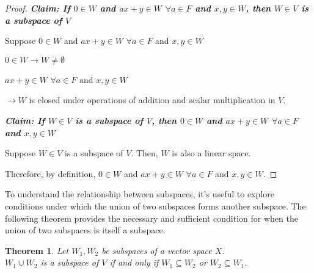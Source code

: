 \documentclass[12pt, reqno]{amsart}
\newtheorem{theorem}{Theorem}[section]
\theoremstyle{definition}
\numberwithin{equation}{section}
\begin{document}
\begin{proof}

\textbf{\textit{Claim: If $ 0 \in W$ and $ax+y \in W$ $\forall a \in F$ and $x,y \in W$, then $W \in V$ is a subspace of $V$}}
    
    Suppose $0 \in W$ and $ax+y \in W$ $\forall a \in F$ and $x,y \in W$
    
    $0 \in W \longrightarrow W \neq \emptyset$ 
    
    $ax+y \in W$ $\forall a \in F$ and $x,y \in W$
    
    $\longrightarrow W$ is closed under operations of addition and scalar multiplication in $V$.
    
    \textbf{\textit{Claim: If $W \in V$ is a subspace of $V$, then $0 \in W$ and $ax+y \in W$ $\forall a \in F$ and $x,y \in W$}}

    Suppose $W \in V$ is a subspace of $V$. Then, $W$ is also a linear space. 
    
    Therefore, by definition, $0 \in W$ and $ax+y \in W$ $\forall a \in F$ and $x,y \in W$.
\end{proof}
To understand the relationship between subspaces, it's useful to explore conditions under which the union of two subspaces forms another subspace. The following theorem provides the necessary and sufficient condition for when the union of two subspaces is itself a subspace.
\begin{theorem}
    Let $W_1, W_2$ be subspaces of a vector space $X$. \\
    $W_1 \cup W_2$ is a subspace of $V$ if and only if $W_1 \subseteq W_2$ or $W_2 \subseteq W_1$.
\end{theorem}
\end{document}
